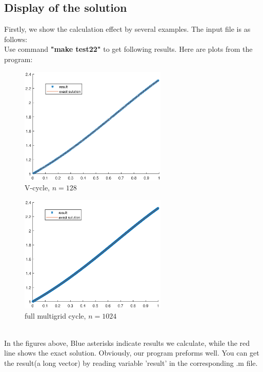 \documentclass[a4paper,twocolumn]{article}
\theoremstyle{definition}
\begin{document}
\subsection{Display of the solution}
Firstly, we show the calculation effect by several examples. The input file is as follows:
\\
Use command \textbf{"make test22"} to get following results. Here are plots from the program:
\begin{figure}[!htp]   
	\centering
	\includegraphics[width=7cm]{Pictures/F22_1.eps}
	\caption{V-cycle, $n = 128$}
\end{figure}
\begin{figure}[!htp]   
	\centering
	\includegraphics[width=7cm]{Pictures/F22_2.eps}
	\caption{full multigrid cycle, $n = 1024$}
\end{figure}\\
In the figures above, Blue asterisks indicate
results we calculate, while the red line shows the exact solution. Obviously, our program preforms well. You can get the result(a long vector) by reading variable 'result' in the corresponding .m file.
\end{document}
